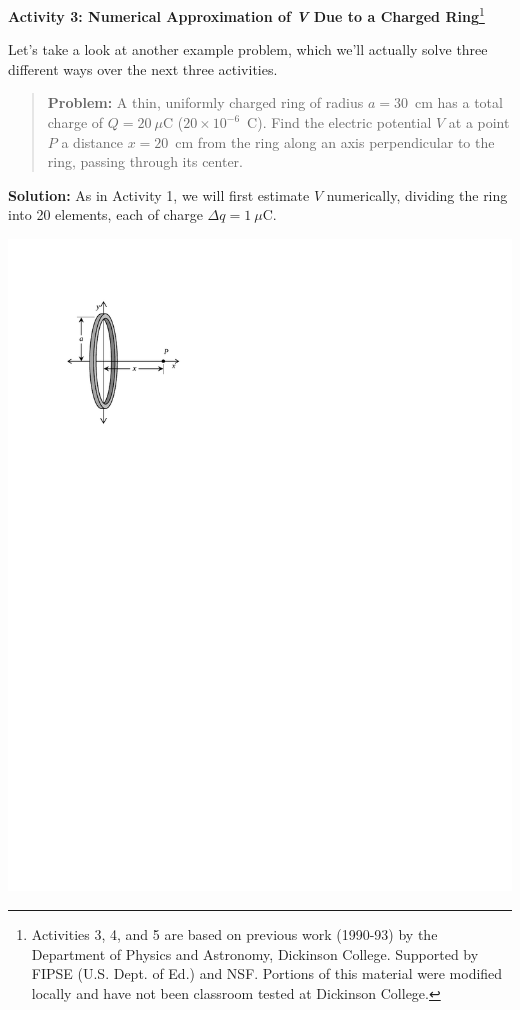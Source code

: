 \textbf{Activity 3: Numerical Approximation of \textit{V} Due to a Charged Ring}\footnote{Activities 3, 4, and 5 are based on previous work (1990-93) by the Department of Physics and Astronomy, Dickinson College. Supported by FIPSE (U.S. Dept. of Ed.) and NSF. Portions of this material were modified locally and have not been classroom tested at Dickinson College.}

\begin{minipage}{0.65\textwidth}
Let's take a look at another example problem, which we'll actually solve three different ways over the next three activities.  

\begin{quote}
\textbf{Problem:} A thin, uniformly charged ring of radius $a=30$~cm has a total charge of $Q = 20\ \mu$C ($20
\times 10^{-6}$~C). Find the electric potential $V$ at a point $P$ a distance $x = 20$~cm from the ring along an axis perpendicular to the ring, passing through its center.
\end{quote}

\textbf{Solution:} As in Activity 1, we will first estimate $V$ numerically, dividing the ring into 20 elements, each of charge $\Delta q = 1\ \mu$C.

\end{minipage}
\begin{minipage}{0.34\textwidth}
\vspace{-0.3in}
\raggedleft \includegraphics[scale=0.9]{potential_charge_distributions/ring_integral.pdf}
\end{minipage}


